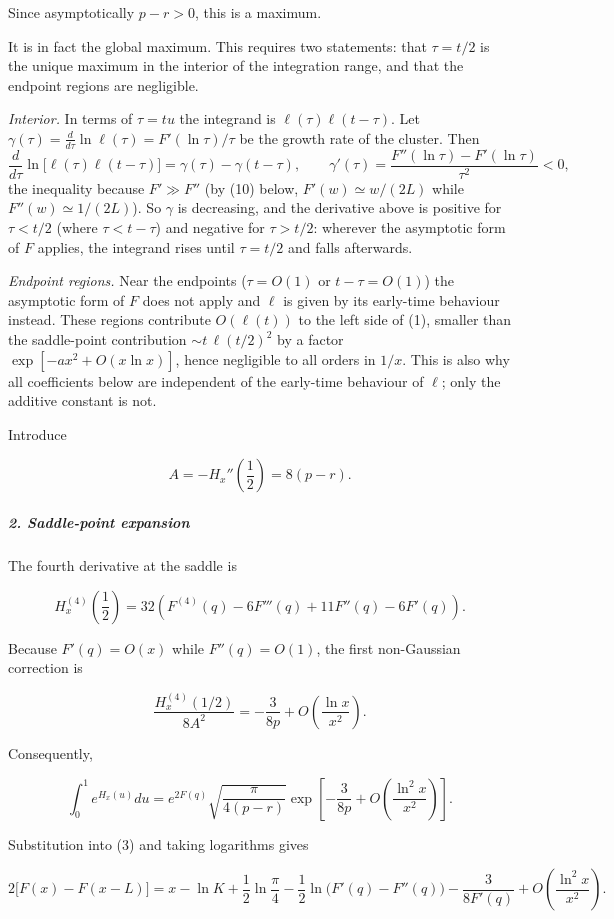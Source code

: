 Since asymptotically $p-r>0$, this is a maximum.
{\color{blue}
It is in fact the global maximum. This requires two statements: that $\tau=t/2$ is the unique maximum in the interior of the integration range, and that the endpoint regions are negligible.

\emph{Interior.} In terms of $\tau=tu$ the integrand is $\ell(\tau)\ell(t-\tau)$. Let $\gamma(\tau)=\frac{d}{d\tau}\ln\ell(\tau)=F'(\ln\tau)/\tau$ be the growth rate of the cluster. Then
\[
\frac{d}{d\tau}\ln\bigl[\ell(\tau)\ell(t-\tau)\bigr]=\gamma(\tau)-\gamma(t-\tau),
\qquad
\gamma'(\tau)=\frac{F''(\ln\tau)-F'(\ln\tau)}{\tau^{2}}<0 ,
\]
the inequality because $F'\gg F''$ (by (10) below, $F'(w)\simeq w/(2L)$ while $F''(w)\simeq1/(2L)$). So $\gamma$ is decreasing, and the derivative above is positive for $\tau<t/2$ (where $\tau<t-\tau$) and negative for $\tau>t/2$: wherever the asymptotic form of $F$ applies, the integrand rises until $\tau=t/2$ and falls afterwards.

\emph{Endpoint regions.} Near the endpoints ($\tau=O(1)$ or $t-\tau=O(1)$) the asymptotic form of $F$ does not apply and $\ell$ is given by its early-time behaviour instead. These regions contribute $O(\ell(t))$ to the left side of (1), smaller than the saddle-point contribution $\sim t\,\ell(t/2)^2$ by a factor $\exp[-ax^2+O(x\ln x)]$, hence negligible to all orders in $1/x$. This is also why all coefficients below are independent of the early-time behaviour of $\ell$; only the additive constant is not.
}
Introduce

\[
A=-H_x''\!\left(\frac12\right)=8(p-r).
\]

\subparagraph*{2. Saddle-point expansion}

The fourth derivative at the saddle is

\[
H_x^{(4)}\!\left(\frac12\right) = 32\left(F^{(4)}(q)-6F'''(q)+11F''(q)-6F'(q)\right).
\]

Because $F'(q)=O(x)$ while $F''(q)=O(1)$, the first non-Gaussian correction is

\[
\frac{H_x^{(4)}(1/2)}{8A^2} =-\frac{3}{8p} +O\!\left(\frac{\ln x}{x^2}\right).
\]

Consequently,

\[
\int_0^1e^{H_x(u)}du = e^{2F(q)} \sqrt{\frac{\pi}{4(p-r)}} \exp\!\left[ -\frac{3}{8p} +O\!\left(\frac{\ln^2x}{x^2}\right) \right]. \tag{4}
\]

Substitution into (3) and taking logarithms gives

\[
2\bigl[F(x)-F(x-L)\bigr] = x-\ln K+\frac12\ln\frac{\pi}{4} -\frac12\ln\!\bigl(F'(q)-F''(q)\bigr) -\frac{3}{8F'(q)} +O\!\left(\frac{\ln^2x}{x^2}\right). \tag{5}
\]

